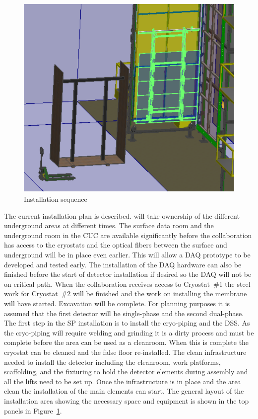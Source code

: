 \begin{figure}[!htb]
\begin{center}
\begin{minipage}[c]{0.32\textwidth}
\end{minipage}
\begin{minipage}[c]{0.32\textwidth}
\includegraphics[width=\textwidth]{far-detector-single-phase/figures/CPA-3.pdf}
\end{minipage}

\caption{Installation sequence}
\label{Install-Seq}
\end{center}
\end{figure}

The current installation plan is described.  will take
ownership of the different underground areas at different times. The
surface data room and the underground room in the CUC are available
significantly before the collaboration has access to the cryostats and
the optical fibers between the surface and underground will be in
place even earlier. This will allow a DAQ prototype to be developed
and tested early. The installation of the DAQ hardware can also be
finished before the start of detector installation if desired so the
DAQ will not be on critical path.  When the collaboration receives
access to Cryostat~\#1 the steel work for Cryostat~\#2 will be
finished and the work on installing the membrane will have
started. Excavation will be complete.  For planning purposes it is assumed that the first detector will be single-phase and the second dual-phase. The first step in the SP
installation is to install the cryo-piping and the DSS. As the
cryo-piping will require welding and grinding it is a dirty process
and must be complete before the area can be used as a cleanroom. When
this is complete the cryostat can be cleaned and the false floor
re-installed. The clean infrastructure needed to install the detector
including the cleanroom, work platforms, scaffolding, and the
fixturing to hold the detector elements during assembly and all the
lifts need to be set up. Once the infrastructure is in place and the area
clean the installation of the main elements can start. The general
layout of the installation area showing the necessary space and
equipment is shown in the top panels in Figure~\ref{Install-Seq}.

